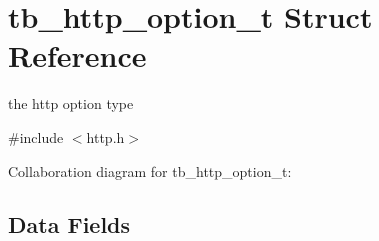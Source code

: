 \hypertarget{structtb__http__option__t}{\section{tb\-\_\-http\-\_\-option\-\_\-t Struct Reference}
\label{structtb__http__option__t}
}


the http option type  




{\ttfamily \#include $<$http.\-h$>$}



Collaboration diagram for tb\-\_\-http\-\_\-option\-\_\-t\-:
\subsection*{Data Fields}
